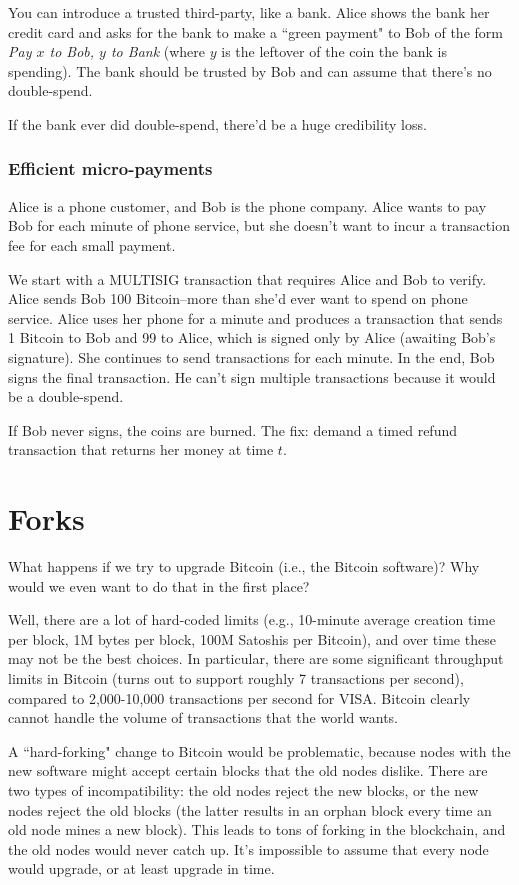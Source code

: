 \documentclass[12pt]{article}
\begin{document}
You can introduce a trusted third-party, like a bank. Alice shows the bank her credit card and asks for the bank to make a ``green payment" to Bob of the form \textit{Pay $x$ to Bob, $y$ to Bank} (where $y$ is the leftover of the coin the bank is spending). The bank should be trusted by Bob and can assume that there's no double-spend.

If the bank ever did double-spend, there'd be a huge credibility loss.

\subsubsection*{Efficient micro-payments}

Alice is a phone customer, and Bob is the phone company. Alice wants to pay Bob for each minute of phone service, but she doesn't want to incur a transaction fee for each small payment.

We start with a MULTISIG transaction that requires Alice and Bob to verify. Alice sends Bob 100 Bitcoin--more than she'd ever want to spend on phone service. Alice uses her phone for a minute and produces a transaction that sends 1 Bitcoin to Bob and 99 to Alice, which is signed only by Alice (awaiting Bob's signature). She continues to send transactions for each minute. In the end, Bob signs the final transaction. He can't sign multiple transactions because it would be a double-spend.

If Bob never signs, the coins are burned. The fix: demand a timed refund transaction that returns her money at time $t$.

\section*{Forks}

What happens if we try to upgrade Bitcoin (i.e., the Bitcoin software)? Why would we even want to do that in the first place?

Well, there are a lot of hard-coded limits (e.g., 10-minute average creation time per block, 1M bytes per block, 100M Satoshis per Bitcoin), and over time these may not be the best choices. In particular, there are some significant throughput limits in Bitcoin (turns out to support roughly 7 transactions per second), compared to 2,000-10,000 transactions per second for VISA. Bitcoin clearly cannot handle the volume of transactions that the world wants.

A ``hard-forking" change to Bitcoin would be problematic, because nodes with the new software might accept certain blocks that the old nodes dislike. There are two types of incompatibility: the old nodes reject the new blocks, or the new nodes reject the old blocks (the latter results in an orphan block every time an old node mines a new block). This leads to tons of forking in the blockchain, and the old nodes would never catch up. It's impossible to assume that every node would upgrade, or at least upgrade in time.
\end{document}
